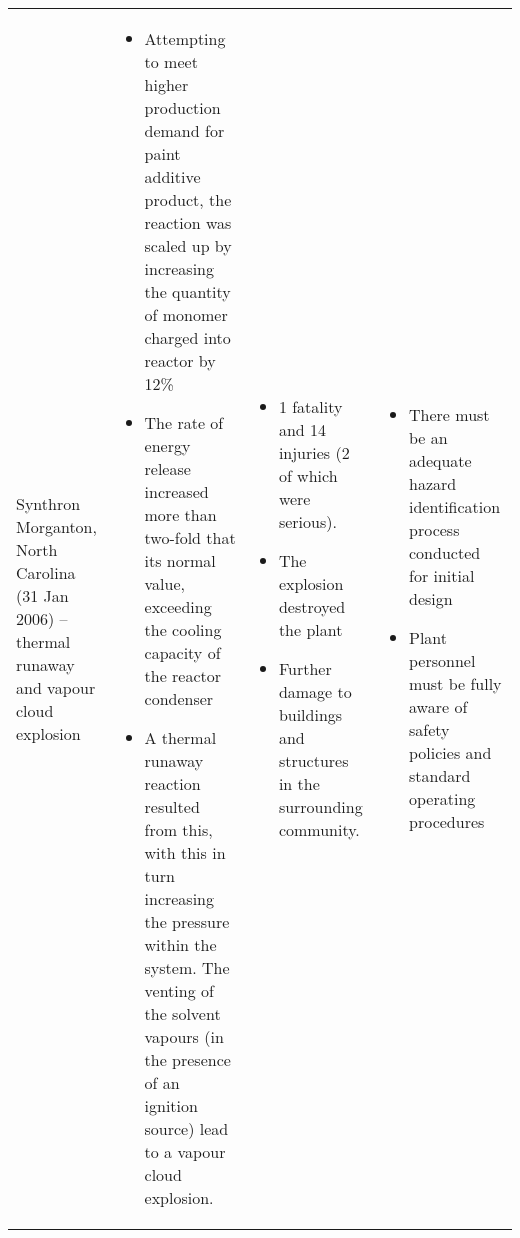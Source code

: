 {\begin{tabular}{@{}p{3cm}p{8cm}p{4cm}p{7cm}@{}}
Synthron  Morganton, North Carolina (31 Jan 2006) – thermal runaway and vapour cloud explosion   & \begin{itemize}[leftmargin=1em]\item Attempting to meet higher production demand for paint additive product, the reaction was scaled up by increasing the quantity of monomer charged into reactor by 12\% \item The rate of energy release increased more than two-fold that its normal value, exceeding the cooling capacity of the reactor condenser\item A thermal runaway reaction resulted from this, with this in turn increasing the pressure within the system. The venting of the solvent vapours (in the presence of an ignition source) lead to a vapour cloud explosion.\end{itemize}                                                                                                                                           & \begin{itemize}[leftmargin=1em]\item 1 fatality and 14 injuries (2 of which were serious).\item The explosion destroyed the plant\item Further damage to buildings and structures in the surrounding community.\end{itemize}                                                                           & \begin{itemize}[leftmargin=1em]\item There must be an adequate hazard identification process conducted for initial design\item Plant personnel must be fully aware of safety policies and standard operating procedures\end{itemize}                                                                                                                                                                                                                                                                                                                                                                                   \\

\end{tabular}}
